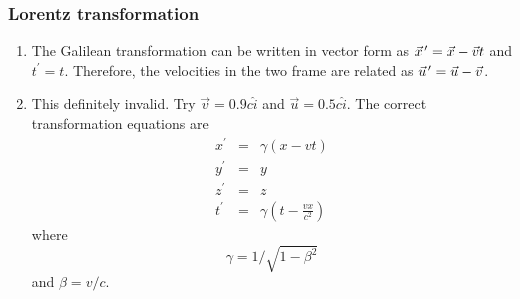 \documentclass{beamer}
\newcommand{\pvec}[1]{\vec{#1}\mkern2mu\vphantom{#1}}
\begin{document}
\begin{frame}
\frametitle{Lorentz transformation}
\begin{enumerate}
\item The Galilean transformation can be written in vector form as $
\pvec{x}^\prime = \vec{x} - \vec{v}t$ and $t^\prime = t$. Therefore, the 
velocities in the two frame are related as $\pvec{u}^\prime = \vec{u} - 
\vec{v}$.
\item This definitely invalid. Try $\vec{v} = 0.9c\hat{i}$ and $\vec{u} = 
0.5c\hat{i}$. The correct transformation equations are
\begin{eqnarray}
x^\prime &=& \gamma(x - vt) \label{e15} \\
y^\prime &=& y \label{e16} \\
z^\prime &=& z \label{e17} \\
t^\prime &=& \gamma\left(t - \frac{vx}{c^2}\right) \label{e18}
\end{eqnarray}
where 
\begin{equation}\label{e19}
\gamma = 1/\sqrt{1 - \beta^2}
\end{equation}
and $\beta = v/c$.
\end{enumerate}
\end{frame}
\end{document}
